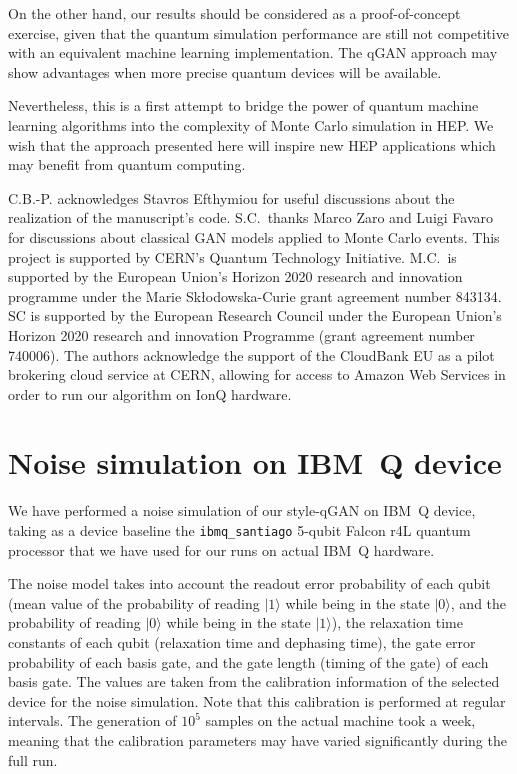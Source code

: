 \documentclass[twocolumn,preprintnumbers,superscriptaddress]{revtex4-2}
\begin{document}
On the other hand, our results should be considered as a proof-of-concept
exercise, given that the quantum simulation performance are still not
competitive with an equivalent machine learning implementation. The qGAN
approach may show advantages when more precise quantum devices will be
available.

Nevertheless, this is a first attempt to bridge the power of quantum machine
learning algorithms into the complexity of Monte Carlo simulation in HEP. We
wish that the approach presented here will inspire new HEP applications which
may benefit from quantum computing.


\acknowledgments

C.B.-P. acknowledges Stavros Efthymiou for useful discussions about the
realization of the manuscript's code. S.C.~thanks Marco Zaro and Luigi Favaro for
discussions about classical GAN models applied to Monte Carlo events. This
project is supported by CERN's Quantum Technology Initiative. 
M.C.\ is supported by the European Union’s Horizon 2020 research and innovation programme under the Marie Skłodowska-Curie grant agreement number 843134.
SC is supported by the European Research
Council under the European Union's Horizon 2020 research and innovation
Programme (grant agreement number 740006). The authors acknowledge the support of the CloudBank EU as a pilot brokering cloud service at CERN, allowing
 for access to Amazon Web Services in order to run our algorithm on IonQ hardware.


 
\appendix

\section{Noise simulation on IBM~Q device}
\label{sec:appendixnoise}

We have performed a noise simulation of our style-qGAN on IBM~Q device, taking as a device baseline the {\tt ibmq\_santiago}
5-qubit Falcon r4L quantum processor that we have used for our runs on actual IBM~Q hardware.

The noise model takes into account the readout error probability of each qubit (mean value of the probability
of reading $|1\rangle$ while being in the state $|0\rangle$, and the probability of reading $|0\rangle$ while being in
the state $|1\rangle$), the relaxation time constants of each qubit (relaxation time and dephasing time), the gate error probability
of each basis gate, and the gate length (timing of the gate) of each basis gate. The values are taken from the calibration information
of the selected device for the noise simulation. Note that this calibration is performed at regular intervals. The generation of
$10^5$ samples on the actual machine took a week, meaning that the calibration parameters may have varied significantly
during the full run.
\end{document}
